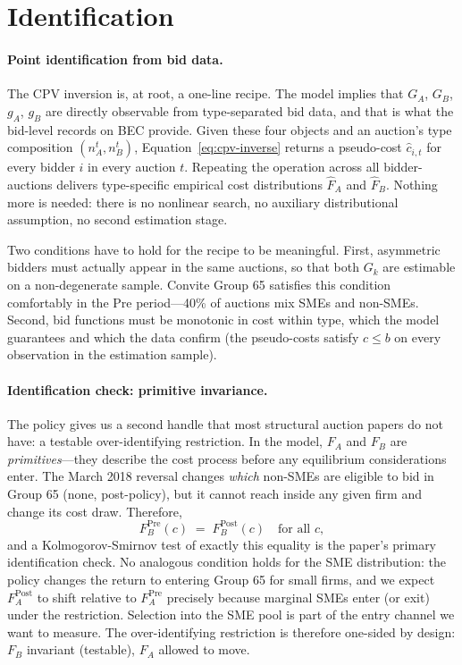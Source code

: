 \documentclass[12pt]{article}
\begin{document}
\section{Identification}
\label{sec:identification}

\paragraph{Point identification from bid data.}
The CPV inversion is, at root, a one-line recipe. The model
implies that $G_A$, $G_B$, $g_A$, $g_B$ are directly observable
from type-separated bid data, and that is what the bid-level
records on BEC provide. Given these four objects and an auction's
type composition $(n_A^t, n_B^t)$, Equation~\eqref{eq:cpv-inverse}
returns a pseudo-cost $\hat c_{i,t}$ for every bidder $i$ in every
auction $t$. Repeating the operation across all bidder-auctions
delivers type-specific empirical cost distributions $\hat F_A$
and $\hat F_B$. Nothing more is needed: there is no nonlinear
search, no auxiliary distributional assumption, no second
estimation stage.

Two conditions have to hold for the recipe to be meaningful.
First, asymmetric bidders must actually appear in the same
auctions, so that both $G_k$ are estimable on a non-degenerate
sample. Convite Group 65 satisfies this condition comfortably in
the Pre period---40\% of auctions mix SMEs and non-SMEs. Second,
bid functions must be monotonic in cost within type, which the
model guarantees and which the data confirm (the pseudo-costs
satisfy $\hat c \leq b$ on every observation in the estimation
sample).

\paragraph{Identification check: primitive invariance.}
The policy gives us a second handle that most structural auction
papers do not have: a testable over-identifying restriction. In
the model, $F_A$ and $F_B$ are \emph{primitives}---they describe
the cost process before any equilibrium considerations enter.
The March 2018 reversal changes \emph{which} non-SMEs are eligible
to bid in Group 65 (none, post-policy), but it cannot reach inside
any given firm and change its cost draw. Therefore,
\[
F_B^{\text{Pre}}(c) \;=\; F_B^{\text{Post}}(c)
\quad \text{for all } c,
\]
and a Kolmogorov-Smirnov test of exactly this equality is the
paper's primary identification check. No analogous condition holds
for the SME distribution: the policy changes the return to entering
Group 65 for small firms, and we expect $F_A^{\text{Post}}$ to
shift relative to $F_A^{\text{Pre}}$ precisely because marginal
SMEs enter (or exit) under the restriction. Selection into the
SME pool is part of the entry channel we want to measure. The
over-identifying restriction is therefore one-sided by design:
$F_B$ invariant (testable), $F_A$ allowed to move.
\end{document}
